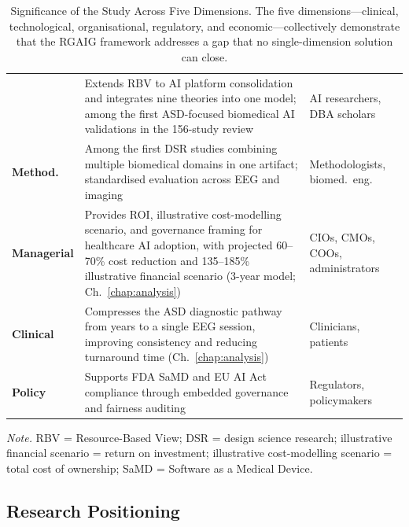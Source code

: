 {\tablestripes\tablefontsize
{}
\begin{xltabular}{\textwidth}{@{} >{\raggedright\arraybackslash}p{2.2cm} p{8.5cm} >{\raggedright\arraybackslash}p{3.7cm} @{}}
\caption[Significance of the Study Across Five Dimensions]{Significance of the Study Across Five Dimensions. The five dimensions---clinical, technological, organisational, regulatory, and economic---collectively demonstrate that the RGAIG framework addresses a gap that no single-dimension solution can close.}\label{tab:significance} \\
\toprule
{} &  &  \\
\midrule
\endfirsthead
\endhead
\bottomrule
\endlastfoot
{} & Extends RBV to AI platform consolidation and integrates nine theories into one model; among the first ASD-focused biomedical AI validations in the 156-study review & AI researchers, DBA scholars \\
\addlinespace
\textbf{Method.} & Among the first DSR studies combining multiple biomedical domains in one artifact; standardised evaluation across EEG and imaging & Methodologists, biomed.\ eng. \\
\addlinespace
\textbf{Managerial} & Provides ROI, illustrative cost-modelling scenario, and governance framing for healthcare AI adoption, with projected 60--70\% cost reduction and 135--185\% illustrative financial scenario (3-year model; Ch.~\ref{chap:analysis}) & CIOs, CMOs, COOs, administrators \\
\addlinespace
\textbf{Clinical} & Compresses the ASD diagnostic pathway from years to a single EEG session, improving consistency and reducing turnaround time (Ch.~\ref{chap:analysis}) & Clinicians, patients \\
\addlinespace
\textbf{Policy} & Supports FDA SaMD and EU AI Act compliance through embedded governance and fairness auditing & Regulators, policymakers \\
\end{xltabular}}
\vspace{0.5em}
\noindent\textit{Note.} RBV = Resource-Based View; DSR = design science research; illustrative financial scenario = return on investment; illustrative cost-modelling scenario = total cost of ownership; SaMD = Software as a Medical Device.

\subsection{Research Positioning}
\label{sec:research_positioning}

